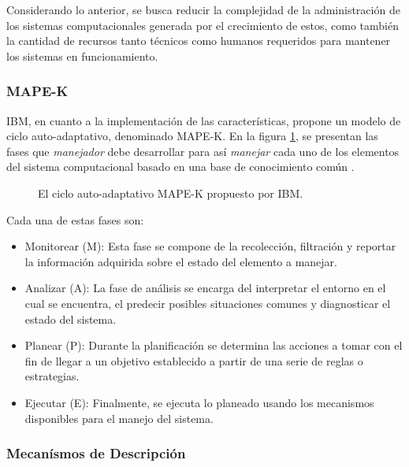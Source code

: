 \documentclass[12pt]{article}
\begin{document}
    Considerando lo anterior, se busca reducir la complejidad de la administración de los sistemas computacionales generada por el crecimiento de estos, como también la cantidad de recursos tanto técnicos como humanos requeridos para mantener los sistemas en funcionamiento.
    
    \subsubsection{MAPE-K}


    IBM, en cuanto a la implementación de las características, propone un modelo de ciclo auto-adaptativo, denominado MAPE-K. En la figura \ref{fig:mapek}, se presentan las fases que \textit{manejador} debe desarrollar para así \textit{manejar} cada uno de los elementos del sistema computacional basado en una base de conocimiento común \cite{Krikava2013}. 

    \begin{figure}[H]
        \centering
        
        \caption{El ciclo auto-adaptativo MAPE-K propuesto por IBM.} \cite{alessandra_2010}
        \label{fig:mapek}
    \end{figure}

    Cada una de estas fases son:

    \begin{itemize}
        \item Monitorear (M): Esta fase se compone de la recolección, filtración y reportar la información adquirida sobre el estado del elemento a manejar.
        \item Analizar (A): La fase de análisis se encarga del interpretar el entorno en el cual se encuentra, el predecir posibles situaciones comunes y diagnosticar el estado del sistema.
        \item Planear (P): Durante la planificación se determina las acciones a tomar con el fin de llegar a un objetivo establecido a partir de una serie de reglas o estrategias.
        \item Ejecutar (E): Finalmente, se ejecuta lo planeado usando los mecanismos disponibles para el manejo del sistema. 
    \end{itemize}

    \subsubsection{Mecanísmos de Descripción}
\end{document}
